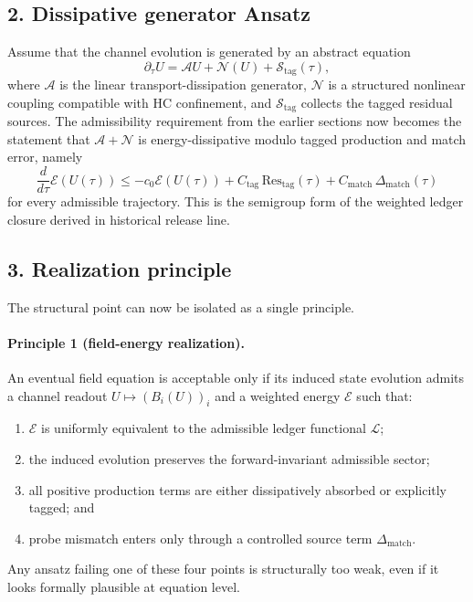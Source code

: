 \documentclass[12pt,a4paper]{article}
\DeclareRobustCommand{\QSCver}[1]{archival stage}
\renewcommand{\QSCver}[1]{historical release line}
\begin{document}
\subsection*{2. Dissipative generator Ansatz}
Assume that the channel evolution is generated by an abstract equation
\[
\partial_\tau U = \mathcal A U + \mathcal N(U) + \mathcal S_{\mathrm{tag}}(\tau),
\]
where $\mathcal A$ is the linear transport-dissipation generator, $\mathcal N$ is a
structured nonlinear coupling compatible with HC confinement, and
$\mathcal S_{\mathrm{tag}}$ collects the tagged residual sources. The admissibility
requirement from the earlier sections now becomes the statement that
$\mathcal A+\mathcal N$ is energy-dissipative modulo tagged production and match
error, namely
\[
\frac{d}{d\tau}\mathcal E(U(\tau))
\le -c_0\mathcal E(U(\tau))
+ C_{\mathrm{tag}}\,\mathrm{Res}_{\mathrm{tag}}(\tau)
+ C_{\mathrm{match}}\,\Delta_{\mathrm{match}}(\tau)
\]
for every admissible trajectory. This is the semigroup form of the weighted ledger
closure derived in \QSCver{v2.6.0}.

\subsection*{3. Realization principle}
The structural point can now be isolated as a single principle.

\paragraph{Principle 1 (field-energy realization).}
An eventual field equation is acceptable only if its induced state evolution admits a
channel readout $U\mapsto (B_i(U))_i$ and a weighted energy $\mathcal E$ such that:
\begin{enumerate}[label=(\alph*)]
 \item $\mathcal E$ is uniformly equivalent to the admissible ledger functional $\mathcal L$;
 \item the induced evolution preserves the forward-invariant admissible sector;
 \item all positive production terms are either dissipatively absorbed or explicitly tagged; and
 \item probe mismatch enters only through a controlled source term $\Delta_{\mathrm{match}}$.
\end{enumerate}
Any ansatz failing one of these four points is structurally too weak, even if it
looks formally plausible at equation level.
\end{document}
